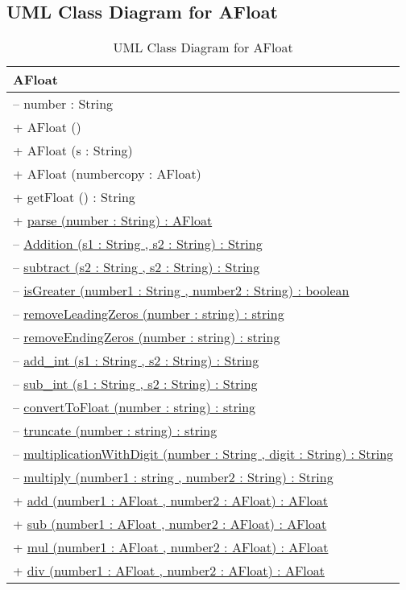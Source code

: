 \documentclass[a4paper,12pt]{article}
\begin{document}
{\subsection{UML Class Diagram for AFloat}

\begin{table}[h!]
\centering
\begin{tabular}{|l|}
\hline
\textbf{AFloat}\\
\hline
-- number : String\\
\hline
+ AFloat () \\
+ AFloat (s : String) \\
+ AFloat (numbercopy : AFloat)\\
+ getFloat () : String \\
+ \underline{parse (number : String) : AFloat} \\
-- \underline{Addition (s1 : String , s2 : String) : String} \\
-- \underline{subtract (s2 : String , s2 : String) : String} \\
-- \underline{isGreater (number1 : String , number2 : String) : boolean }\\
-- \underline{removeLeadingZeros (number : string) : string} \\
-- \underline{removeEndingZeros (number : string) : string} \\
-- \underline{add\_int (s1 : String , s2 : String) : String} \\
-- \underline{sub\_int (s1 : String , s2 : String) : String} \\
-- \underline{convertToFloat (number : string) : string} \\
-- \underline{truncate (number : string) : string} \\
-- \underline{multiplicationWithDigit (number : String , digit : String) : String} \\
-- \underline{multiply (number1 : string , number2 : String) : String} \\
+ \underline{add (number1 : AFloat , number2 : AFloat) : AFloat} \\
+ \underline{sub (number1 : AFloat , number2 : AFloat) : AFloat} \\
+ \underline{mul (number1 : AFloat , number2 : AFloat) : AFloat} \\
+ \underline{div (number1 : AFloat , number2 : AFloat) : AFloat} \\
\hline
\end{tabular}
\caption{UML Class Diagram for AFloat}
\end{table}



}
\end{document}
